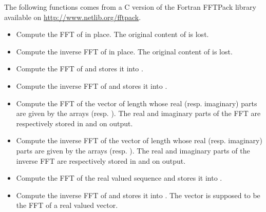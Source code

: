 The following functions comes from a C version of the Fortran FFTPack library
available on \url{http://www.netlib.org/fftpack}.
\begin{itemize}
\item {}
  \sshortdescribe Compute the FFT of  in place. The original content
  of  is lost.

\item {}
  \sshortdescribe Compute the inverse FFT of  in place. The
  original content of  is lost.

\item {}
  \sshortdescribe Compute the FFT of  and stores it into .

\item {}
  \sshortdescribe Compute the inverse FFT of  and stores it into .

\item {}
  \sshortdescribe Compute the FFT of the vector of length  whose real
  (resp. imaginary) parts are given by the arrays 
  (resp. ). The real and imaginary parts of the FFT are respectively
  stored in  and  on output.

\item {}
  \sshortdescribe Compute the inverse FFT of the vector of length 
  whose real (resp. imaginary) parts are given by the arrays 
  (resp. ). The real and imaginary parts of the inverse FFT are
  respectively stored in  and  on output.

\item {}
  \sshortdescribe Compute the FFT of the real valued sequence  and
  stores it into .

\item {}
  \sshortdescribe Compute the inverse FFT of  and stores it into . The vector  is supposed to be the FFT of a real valued vector.


\end{itemize}
